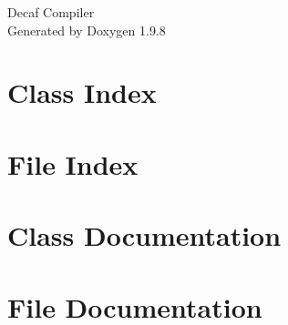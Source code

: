 \documentclass[twoside]{book}
\newcommand{\+}{\discretionary{\mbox{\scriptsize$\hookleftarrow$}}{}{}}
\newcommand{\clearemptydoublepage}{%
    \newpage{\pagestyle{empty}\cleardoublepage}%
  }
\begin{document}
  \raggedbottom
    \hypersetup{pageanchor=false,
                bookmarksnumbered=true,
                pdfencoding=unicode
               }
  \begin{titlepage}
  \vspace*{7cm}
  \begin{center}%
  {\Large Decaf Compiler}\\
  \vspace*{1cm}
  {\large Generated by Doxygen 1.9.8}\\
  \end{center}
  \end{titlepage}
  \clearemptydoublepage
  \tableofcontents
  \clearemptydoublepage
  \hypersetup{pageanchor=true}

\chapter{Class Index}

\chapter{File Index}

\chapter{Class Documentation}



























\chapter{File Documentation}





















  \backmatter
  \newpage
  \clearemptydoublepage
  \printindex
\end{document}
